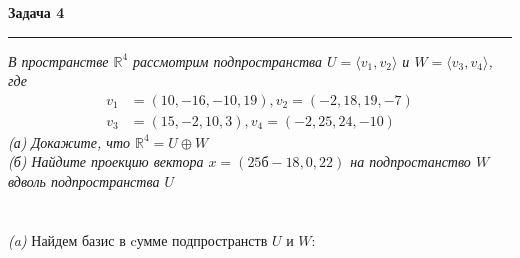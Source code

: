\documentclass[10pt]{article}
\begin{document}
\textbf{\Large Задача 4}
\medskip\hrule\medskip
\textsl{В пространстве $\mathbb{R}^4$ рассмотрим подпространства $U = \langle v_1, v_2\rangle$ и $W = \langle v_3, v_4\rangle$, где }
\begin{align*}
	v_1 &= (10, -16, -10, 19), v_2 = (-2, 18, 19, -7) \\
	v_3 &= (15, -2, 10, 3), v_4 = (-2, 25, 24, -10)
\end{align*}
\textsl{(а) Докажите, что $\mathbb{R}^4 = U \oplus W$ \\ (б) Найдите проекцию вектора $x = (25б -18, 0, 22)$ на подпростанство  $W$ вдволь подпространства $U$} \\ 

 \\ \\
\textsl{(a)} Найдем базис в cумме подпространств $ U $ и $ W $:
\end{document}
